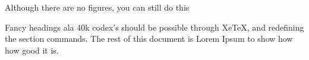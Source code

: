 \documentclass{article}
\begin{document}
\begin{multicols}{3}
Although there are no figures, you can still do this

Fancy headings ala 40k codex's should be possible through XeTeX, and redefining the section commands. The rest of this document is Lorem Ipsum to show how how good it is.
\blinddocument

\end{multicols}
\end{document}
